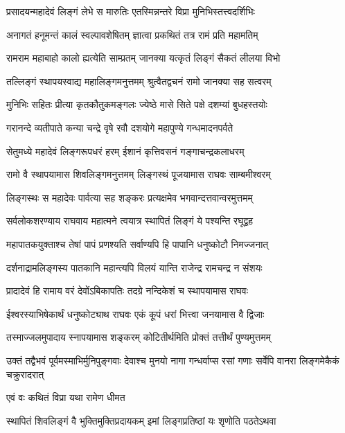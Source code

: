\twolineshloka
{प्रसादयन्महादेवं लिङ्गं लेभे स मारुतिः}
{एतस्मिन्नन्तरे विप्रा मुनिभिस्तत्त्वदर्शिभिः}%

\twolineshloka
{अनागतं हनूमन्तं कालं स्वल्पावशेषितम्}
{ज्ञात्वा प्रकथितं तत्र रामं प्रति महामतिम्}%

\twolineshloka
{रामराम महाबाहो कालो ह्यत्येति साम्प्रतम्}
{जानक्या यत्कृतं लिङ्गं सैकतं लीलया विभो}%

\twolineshloka
{तल्लिङ्गं स्थापयस्वाद्य महालिङ्गमनुत्तमम्}
{श्रुत्वैतद्वचनं रामो जानक्या सह सत्वरम्}%

\twolineshloka
{मुनिभिः सहितः प्रीत्या कृतकौतुकमङ्गलः}
{ज्येष्ठे मासे सिते पक्षे दशम्यां बुधहस्तयोः}%

\twolineshloka
{गरानन्दे व्यतीपाते कन्या चन्द्रे वृषे रवौ}
{दशयोगे महापुण्ये गन्धमादनपर्वते}%

\twolineshloka
{सेतुमध्ये महादेवं लिङ्गरूपधरं हरम्}
{ईशानं कृत्तिवसनं गङ्गाचन्द्रकलाधरम्}%

\twolineshloka
{रामो वै स्थापयामास शिवलिङ्गमनुत्तमम्}
{लिङ्गस्थं पूजयामास राघवः साम्बमीश्वरम्}%

\twolineshloka
{लिङ्गस्थः स महादेवः पार्वत्या सह शङ्करः}
{प्रत्यक्षमेव भगवान्दत्तवान्वरमुत्तमम्}%

\twolineshloka
{सर्वलोकशरण्याय राघवाय महात्मने}
{त्वयात्र स्थापितं लिङ्गं ये पश्यन्ति रघूद्वह}%

\twolineshloka
{महापातकयुक्ताश्च तेषां पापं प्रणश्यति}
{सर्वाण्यपि हि पापानि धनुष्कोटौ निमज्जनात्}%

\twolineshloka
{दर्शनाद्रामलिङ्गस्य पातकानि महान्त्यपि}
{विलयं यान्ति राजेन्द्र रामचन्द्र न संशयः}%

\twolineshloka
{प्रादादेवं हि रामाय वरं देवोंऽबिकापतिः}
{तदग्रे नन्दिकेशं च स्थापयामास राघवः}%

\twolineshloka
{ईश्वरस्याभिषेकार्थं धनुष्कोट्याथ राघवः}
{एकं कूपं धरां भित्त्वा जनयामास वै द्विजाः}%

\twolineshloka
{तस्माज्जलमुपादाय स्नापयामास शङ्करम्}
{कोटितीर्थमिति प्रोक्तं तत्तीर्थं पुण्यमुत्तमम्}%

\threelineshloka
{उक्तं तद्वैभवं पूर्वमस्माभिर्मुनिपुङ्गवाः}
{देवाश्च मुनयो नागा गन्धर्वाप्स रसां गणाः}
{सर्वेपि वानरा लिङ्गमेकैकं चक्रुरादरात्}%



\onelineshloka
{एवं वः कथितं विप्रा यथा रामेण धीमत}%

\twolineshloka
{स्थापितं शिवलिङ्गं वै भुक्तिमुक्तिप्रदायकम्}
{इमां लिङ्गप्रतिष्ठां यः शृणोति पठतेऽथवा}%

